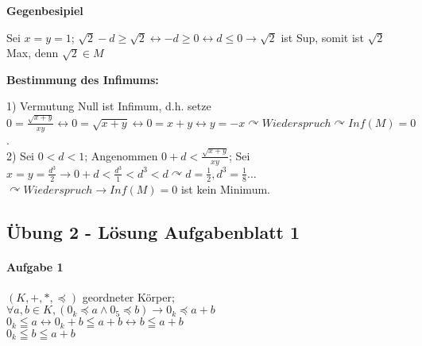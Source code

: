 \documentclass[10pt,a4paper]{scrartcl}
\begin{document}
\textbf{Gegenbesipiel}
\begin{tabbing}
	Sei $x = y = 1$; $\sqrt{2} - d\geq \sqrt{2} \leftrightarrow -d\geq 0 \leftrightarrow d\leq 0\rightarrow\sqrt{2}$ ist Sup, somit ist $\sqrt{2}$ Max, denn $\sqrt{2}\in M$
\end{tabbing}

\textbf{Bestimmung des Infimums:}
\begin{tabbing}
1) Vermutung Null ist Infimum, d.h. setze $0 = \frac{\sqrt{x + y}}{xy}\leftrightarrow 0 =\sqrt{x + y}\leftrightarrow 0 = x + y\leftrightarrow y = -x\curvearrowright Wiederspruch\curvearrowright Inf(M) = 0$.\\
2) Sei $0 < d < 1$; Angenommen $0 + d < \frac{\sqrt{x + y}}{xy}$; Sei $x=y=\frac{d^{3}}{2}\rightarrow 0+d<\frac{d^{3}}{1}<d^{3}<d\curvearrowright d=\frac{1}{2}, d^{3}=\frac{1}{8}\ldots$\\
		$\curvearrowright Wiederspruch\rightarrow Inf(M)=0$ ist kein Minimum.
\end{tabbing}

\subsection*{Übung 2 - Lösung Aufgabenblatt 1}
\paragraph*{Aufgabe 1}
\begin{tabbing}
$(K,+,*,\preceq)$ geordneter Körper;\\
$\forall a,b\in K, (0_{k}\preceq a\wedge 0_{5}\preceq b)\rightarrow 0_{k}\preceq a + b$\\
$0_{k}\leqq a\leftrightarrow 0_{k} + b\leqq a+ b\leftrightarrow b\leqq a + b$\\
$0_{k}\leqq b\leqq a + b$\\
\end{tabbing}
\end{document}
